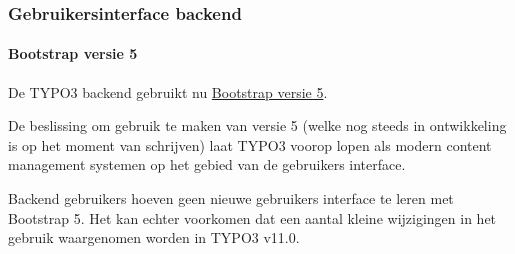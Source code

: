 %

\begin{frame}[fragile]
	\frametitle{Gebruikersinterface backend}
	\framesubtitle{Bootstrap versie 5}

	De TYPO3 backend gebruikt nu
	\href{https://getbootstrap.com/}{Bootstrap versie 5}.

	\vspace{0.2cm}

	De beslissing om gebruik te maken van versie 5 (welke nog steeds in
	ontwikkeling is op het moment van schrijven) laat TYPO3 voorop lopen
	als modern content management systemen op het gebied van de gebruikers
	interface.

	\vspace{0.2cm}

	Backend gebruikers hoeven geen nieuwe gebruikers interface te leren met
	Bootstrap 5. Het kan echter voorkomen dat een aantal kleine wijzigingen in
	het gebruik waargenomen worden in TYPO3 v11.0.

\end{frame}

